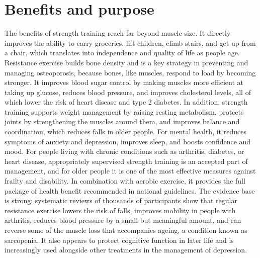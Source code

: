 \section*{Benefits and purpose}
The benefits of strength training reach far beyond muscle size. It directly improves the ability to carry groceries, lift children, climb stairs, and get up from a chair, which translates into independence and quality of life as people age. Resistance exercise builds bone density and is a key strategy in preventing and managing osteoporosis, because bones, like muscles, respond to load by becoming stronger. It improves blood sugar control by making muscles more efficient at taking up glucose, reduces blood pressure, and improves cholesterol levels, all of which lower the risk of heart disease and type 2 diabetes. In addition, strength training supports weight management by raising resting metabolism, protects joints by strengthening the muscles around them, and improves balance and coordination, which reduces falls in older people. For mental health, it reduces symptoms of anxiety and depression, improves sleep, and boosts confidence and mood. For people living with chronic conditions such as arthritis, diabetes, or heart disease, appropriately supervised strength training is an accepted part of management, and for older people it is one of the most effective measures against frailty and disability. In combination with aerobic exercise, it provides the full package of health benefit recommended in national guidelines. The evidence base is strong: systematic reviews of thousands of participants show that regular resistance exercise lowers the risk of falls, improves mobility in people with arthritis, reduces blood pressure by a small but meaningful amount, and can reverse some of the muscle loss that accompanies ageing, a condition known as sarcopenia. It also appears to protect cognitive function in later life and is increasingly used alongside other treatments in the management of depression.

